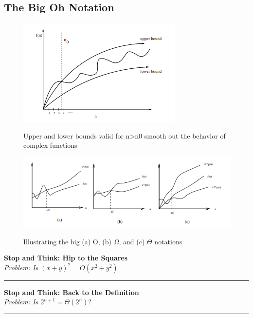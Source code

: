 \subsection{The Big Oh Notation}

\begin{figure}[H]
  \centering
     \includegraphics[scale=0.6]{./2_2.png}
  \label{fig:demo-diagram2-2}
  \caption{Upper and lower bounds valid for n>n0 smooth out the behavior of complex
		   functions}
\end{figure}

\begin{figure}[H]
  \centering
     \includegraphics[scale=0.6]{./2_3.png}
  \label{fig:demo-diagram2-3}
  \caption{ Illustrating the big (a) O, (b) $\Omega$, and (c) $\Theta$ notations}
\end{figure}

\textbf{Stop and Think: Hip to the Squares} \\

\emph{Problem: Is $(x+y)^{2} = O(x^{2} + y^{2})$}

\noindent\rule{\textwidth}{0.4pt}

\textbf{Stop and Think: Back to the Definition} \\

\emph{Problem: Is $2^{n+1} = \Theta (2^{n}) ?$}

\noindent\rule{\textwidth}{0.4pt}